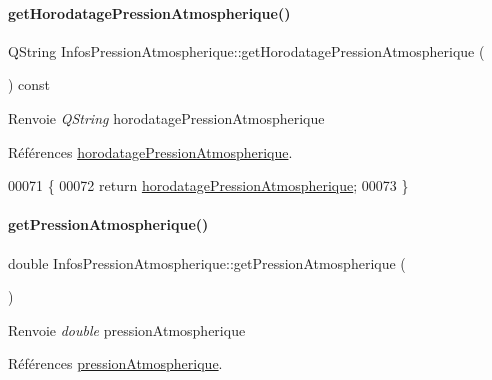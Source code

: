 \paragraph{\texorpdfstring{get\+Horodatage\+Pression\+Atmospherique()}{getHorodatagePressionAtmospherique()}}
{\footnotesize\ttfamily Q\+String Infos\+Pression\+Atmospherique\+::get\+Horodatage\+Pression\+Atmospherique (\begin{DoxyParamCaption}{ }\end{DoxyParamCaption}) const}

\begin{DoxyReturn}{Renvoie}
{\itshape Q\+String} horodatage\+Pression\+Atmospherique 
\end{DoxyReturn}


Références \hyperlink{class_infos_pression_atmospherique_aba207458a51a9290e4f2e0795983a44e}{horodatage\+Pression\+Atmospherique}.


\begin{DoxyCode}
00071 \{
00072     \textcolor{keywordflow}{return} \hyperlink{class_infos_pression_atmospherique_aba207458a51a9290e4f2e0795983a44e}{horodatagePressionAtmospherique};
00073 \}
\end{DoxyCode}
\mbox{\label{class_infos_pression_atmospherique_ace9906ecdd245d4d443554fcc77c76a5}} 
\paragraph{\texorpdfstring{get\+Pression\+Atmospherique()}{getPressionAtmospherique()}}
{\footnotesize\ttfamily double Infos\+Pression\+Atmospherique\+::get\+Pression\+Atmospherique (\begin{DoxyParamCaption}{ }\end{DoxyParamCaption})}

\begin{DoxyReturn}{Renvoie}
{\itshape double} pression\+Atmospherique 
\end{DoxyReturn}


Références \hyperlink{class_infos_pression_atmospherique_a69f31dc0d0ef59f8ced23e4663ee1ab8}{pression\+Atmospherique}.



